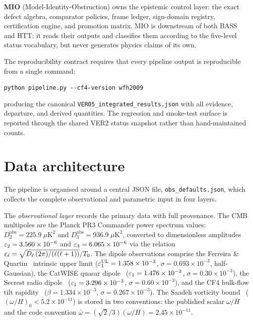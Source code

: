 \textbf{MIO} (Model-Identity-Obstruction) owns the
epistemic control layer: the exact defect algebra,
comparator policies, frame ledger, sign-domain registry,
certification engine, and promotion matrix.  MIO is
downstream of both BASS and HTT: it reads their outputs
and classifies them according to the five-level status
vocabulary, but never generates physics claims of its own.

The reproducibility contract requires that every pipeline
output is reproducible from a single command:
\begin{center}
\texttt{python pipeline.py -{}-cf4-version wfh2009}
\end{center}
producing the canonical \texttt{VER05\_integrated\_results.json}
with all evidence, departure, and derived quantities.  The
regression and smoke-test surface is reported through the
shared VER2 status snapshot rather than hand-maintained counts.





\section{Data architecture}\label{sec:data-arch}

The pipeline is organised around a central JSON file,
\texttt{obs\_defaults.json}, which collects the complete
observational and parametric input in four layers.

The \emph{observational layer} records the primary data with
full provenance.  The CMB multipoles are the Planck PR3
Commander power spectrum values: $D_2^{\mathrm{obs}} =
225.9\;\mu\mathrm{K}^2$ and $D_3^{\mathrm{obs}} =
936.9\;\mu\mathrm{K}^2$, converted to dimensionless amplitudes
$\varepsilon_2 = 3.560 \times 10^{-6}$ and $\varepsilon_3 = 6.065 \times
10^{-6}$ via the relation $\varepsilon_\ell = \sqrt{D_\ell\,(2\pi)/
(\ell(\ell+1))}/T_0$.  The dipole observations comprise the
Ferreira \& Quartin~\cite{Ferreira2021} intrinsic upper limit
($\varepsilon_1^{\mathrm{UL}} = 1.358 \times 10^{-3}$,
$\sigma = 0.693 \times 10^{-3}$, half-Gaussian), the CatWISE
quasar dipole~\cite{Boehme2025} ($\varepsilon_1 = 1.476 \times
10^{-3}$, $\sigma = 0.30 \times 10^{-3}$), the Secrest radio
dipole~\cite{Secrest2021} ($\varepsilon_1 = 3.296 \times 10^{-3}$,
$\sigma = 0.60 \times 10^{-3}$), and the CF4 bulk-flow tilt
rapidity~\cite{Watkins2023} ($\beta = 1.334 \times 10^{-3}$,
$\sigma = 0.267 \times 10^{-3}$).  The Saadeh vorticity
bound~\cite{Saadeh2016b} ($(\omega/H)_0 < 5.2 \times 10^{-11}$)
is stored in two conventions: the published scalar
$\omega/H$ and the code convention $\bar{\omega} =
(\sqrt{2}/3)(\omega/H) = 2.45 \times 10^{-11}$.

